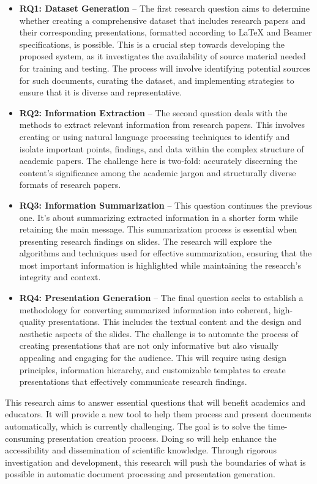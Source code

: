 \begin{itemize}
  \item \textbf{RQ1: Dataset Generation} – The first research question aims to determine whether creating a comprehensive dataset that includes research papers and their corresponding presentations, formatted according to LaTeX and Beamer specifications, is possible. This is a crucial step towards developing the proposed system, as it investigates the availability of source material needed for training and testing. The process will involve identifying potential sources for such documents, curating the dataset, and implementing strategies to ensure that it is diverse and representative.
  
  \item \textbf{RQ2: Information Extraction} – The second question deals with the methods to extract relevant information from research papers. This involves creating or using natural language processing techniques to identify and isolate important points, findings, and data within the complex structure of academic papers. The challenge here is two-fold: accurately discerning the content's significance among the academic jargon and structurally diverse formats of research papers.
  
  \item \textbf{RQ3: Information Summarization} – This question continues the previous one. It's about summarizing extracted information in a shorter form while retaining the main message. This summarization process is essential when presenting research findings on slides. The research will explore the algorithms and techniques used for effective summarization, ensuring that the most important information is highlighted while maintaining the research's integrity and context.
  
  \item \textbf{RQ4: Presentation Generation} – The final question seeks to establish a methodology for converting summarized information into coherent, high-quality presentations. This includes the textual content and the design and aesthetic aspects of the slides. The challenge is to automate the process of creating presentations that are not only informative but also visually appealing and engaging for the audience. This will require using design principles, information hierarchy, and customizable templates to create presentations that effectively communicate research findings.
\end{itemize}

This research aims to answer essential questions that will benefit academics and educators. It will provide a new tool to help them process and present documents automatically, which is currently challenging. The goal is to solve the time-consuming presentation creation process. Doing so will help enhance the accessibility and dissemination of scientific knowledge. Through rigorous investigation and development, this research will push the boundaries of what is possible in automatic document processing and presentation generation.

